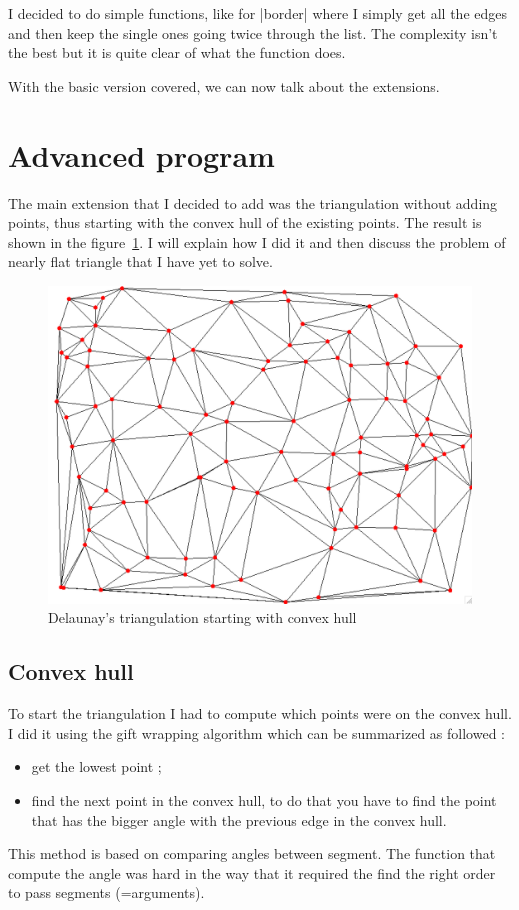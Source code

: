 \documentclass[a4paper,11pt]{article}%
\begin{document}
I decided to do simple functions, like for |border| where I simply get all the edges and then keep the single ones going twice through the list. The complexity isn't the best but it is quite clear of what the function does.


With the basic version covered, we can now talk about the extensions.



\section{Advanced program}

The main extension that I decided to add was the triangulation without adding points, thus starting with the convex hull of the existing points. The result is shown in the figure~\ref{fig:good}. I will explain how I did it and then discuss the problem of nearly flat triangle that I have yet to solve.

\begin{figure}[H]
	\begin{center}
		\includegraphics[scale=0.3]{convexhull-good.png}
	\end{center}
	\caption{Delaunay's triangulation starting with convex hull}
	\label{fig:good}
\end{figure}

\subsection{Convex hull}
To start the triangulation I had to compute which points were on the convex hull. I did it using the gift wrapping algorithm which can be summarized as followed : 
\begin{itemize}
	\item get the lowest point ;
	\item find the next point in the convex hull, to do that you have to find the point that has the bigger angle with the previous edge in the convex hull.
\end{itemize}
This method is based on comparing angles between segment. The function that compute the angle was hard in the way that it required the find the right order to pass segments (=arguments).
\end{document}
